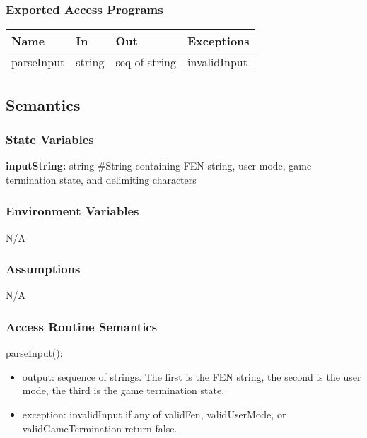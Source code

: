 \documentclass[12pt, titlepage]{article}
\begin{document}
    \subsubsection{Exported Access Programs}
        \begin{center}
        \begin{tabular}{p{4.5cm} p{3cm} p{4cm} p{2.5cm}}
        \hline
        \textbf{Name} & \textbf{In} & \textbf{Out} & \textbf{Exceptions} \\
        \hline
        parseInput & string & seq of string & invalidInput \\
        \hline
        \end{tabular}
        \end{center}

    \subsection{Semantics}
    \subsubsection{State Variables}
    \textbf{inputString:} string \#String containing FEN string, user mode, game 
    termination state, and delimiting characters

    \subsubsection{Environment Variables}
    N/A

    \subsubsection{Assumptions}
    N/A

    \subsubsection{Access Routine Semantics}
        \noindent parseInput():
        \begin{itemize}
        \item output: sequence of strings. The first is the FEN string, the second is 
            the user mode, the third is the game termination state.
        \item exception: invalidInput if any of validFen, validUserMode, 
            or validGameTermination return false.
        \end{itemize}
\end{document}
